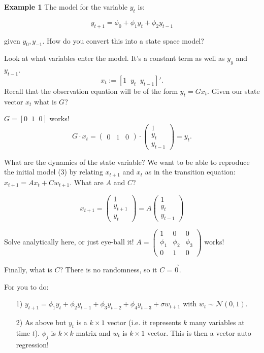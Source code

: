 \documentclass[11pt]{article}
\theoremstyle{definition}
\begin{document}
\begin{shaded}
\textbf{Example 1} \newline
The model for the variable $y_{t}$ is:

\begin{equation} y_{t+1} = \phi_{0} + \phi_{1} y_{t} + \phi_{2} y_{t-1} 
\end{equation}

 given $y_{0},y_{-1}$. How do you convert this into a state space model?

Look at what variables enter the model. It's a constant term as well as $y_{y}$ and $y_{t-1}$.
$$x_{t}:= [1\;\; y_{t}\;\; y_{t-1}]'.$$
Recall that the observation equation will be of the form $y_{t} = G x_{t}$. Given our state vector $x_{t}$ what is $G$? \newline

$G = [0\;\; 1\;\; 0]$ works! $$G\cdot x_{t} = \begin{pmatrix} 0 & 1 & 0 \end{pmatrix} \cdot \begin{pmatrix} 1\\ y_{t}\\ y_{t-1} \end{pmatrix} = y_{t}.$$

What are the dynamics of the state variable? We want to be able to reproduce the initial model (3) by relating $x_{t+1}$ and $x_{t}$ as in the transition equation: $x_{t+1} = Ax_{t} + C w_{t+1}$. What are $A$ and $C$?

$$x_{t+1} = \begin{pmatrix} 1\\ y_{t+1}\\ y_{t}\end{pmatrix} = A \begin{pmatrix} 1\\ y_{t}\\ y_{t-1} \end{pmatrix}$$

Solve analytically here, or just eye-ball it! $A=\begin{pmatrix} 1 & 0 & 0\\
\phi_{1} & \phi_{2} & \phi_{3}\\ 0 & 1 & 0 \end{pmatrix}$ works!

Finally, what is $C$? There is no randomness, so it $C=\vec{0}$.

\end{shaded}


For you to do:
\begin{itemize}
  \item[1)] $y_{t+1} = \phi_{1} y_{t} + \phi_{2} y_{t-1} + \phi_{3} y_{t-2} + \phi_{4} y_{t-3} + \sigma w_{t+1}$ with $w_{t} \sim \mathcal{N}(0,1)$.
  \item[2)] As above but $y_{t}$ is a $k\times 1$ vector (i.e. it represents $k$ many variables at time $t$). $\phi_{j}$ is $k\times k$ matrix and $w_{t}$ is $k\times 1$ vector. This is then a vector auto regression!
\end{itemize}
\end{document}
